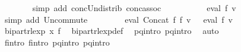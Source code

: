 \begin{isabellebody}
\ \ \ \ \ \ \isamarkupfalse%
\ {\isacharparenleft}{\kern0pt}simp\ add{\isacharcolon}{\kern0pt}\ conc{\isacharunderscore}{\kern0pt}Un{\isacharunderscore}{\kern0pt}distrib{\isacharparenleft}{\kern0pt}{}{\isacharparenright}{\kern0pt}\ conc{\isacharunderscore}{\kern0pt}assoc{\isacharparenright}{\kern0pt}\isanewline
\ \ \ \ \isamarkupfalse%
\ \isamarkupfalse%
\ {\isachardoublequoteopen}{\isasymdots}\ {\isacharequal}{\kern0pt}\ {\isasymPsi}\ {\isacharparenleft}{\kern0pt}eval\ {\isacharquery}{\kern0pt}f{\isacharprime}{\kern0pt}\ v{\isacharparenright}{\kern0pt}{\isachardoublequoteclose}\isanewline
\ \ \ \ \ \ \isamarkupfalse%
\ {\isacharparenleft}{\kern0pt}simp\ add{\isacharcolon}{\kern0pt}\ Un{\isacharunderscore}{\kern0pt}commute{\isacharparenright}{\kern0pt}\isanewline
\ \ \ \ \isamarkupfalse%
\ \isamarkupfalse%
\ {\isachardoublequoteopen}{\isasymPsi}\ {\isacharparenleft}{\kern0pt}eval\ {\isacharparenleft}{\kern0pt}Concat\ f{}\ f{}{\isacharparenright}{\kern0pt}\ v{\isacharparenright}{\kern0pt}\ {\isacharequal}{\kern0pt}\ {\isasymPsi}\ {\isacharparenleft}{\kern0pt}eval\ {\isacharquery}{\kern0pt}f{\isacharprime}{\kern0pt}\ v{\isacharparenright}{\kern0pt}{\isachardoublequoteclose}\ \isakeywordONE{{\isachardot}{\kern0pt}}\isamarkupfalse%
\isanewline
\ \ \isamarkupfalse%
\isanewline
\ \ \isamarkupfalse%
\ \isamarkupfalse%
\ {\isachardoublequoteopen}bipart{\isacharunderscore}{\kern0pt}rlexp\ x\ {\isacharquery}{\kern0pt}f{\isacharprime}{\kern0pt}{\isachardoublequoteclose}\ \isamarkupfalse%
\ bipart{\isacharunderscore}{\kern0pt}rlexp{\isacharunderscore}{\kern0pt}def\ \isamarkupfalse%
\ p{}{\isacharunderscore}{\kern0pt}q{}{\isacharunderscore}{\kern0pt}intro\ p{}{\isacharunderscore}{\kern0pt}q{}{\isacharunderscore}{\kern0pt}intro\ \isamarkupfalse%
\ auto\isanewline
\ \ \isamarkupfalse%
\ \isamarkupfalse%
\ f{}{\isacharprime}{\kern0pt}{\isacharunderscore}{\kern0pt}intro\ f{}{\isacharprime}{\kern0pt}{\isacharunderscore}{\kern0pt}intro\ p{}{\isacharunderscore}{\kern0pt}q{}{\isacharunderscore}{\kern0pt}intro\ p{}{\isacharunderscore}{\kern0pt}q{}{\isacharunderscore}{\kern0pt}intro\isanewline
\ \ \ \ \isamarkupfalse%

\end{isabellebody}
